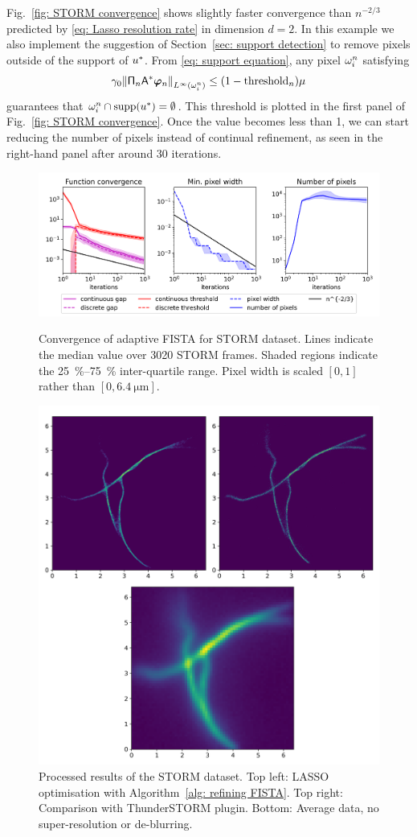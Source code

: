 \documentclass[smallextended]{svjour3}
\newcommand{\norm}[1]{{\left\lVert #1 \right\rVert}}
\newcommand{\op}[1]{\operatorname{#1}}
\newcommand{\1}{\F{1}}
\newcommand*{\var}[1]{%
	\IfEqCase{#1}{%
		{0}{u}%
		{1}{v}%
		{2}{w}%
	}[u#1]%
}
\newcommand*{\vars}[1]{%
	\IfEqCase{#1}{%
		{0}{\alpha}%
		{1}{\beta}%
		{2}{\gamma}%
		{3}{a}%
		{4}{b}%
		{5}{c}%
	}[k#1]%
}
\begin{document}
	Fig.~\ref{fig: STORM convergence} shows slightly faster convergence than $n^{-2/3}$ predicted by \eqref{eq: Lasso resolution rate} in dimension $d=2$. In this example we also implement the suggestion of Section~\ref{sec: support detection} to remove pixels outside of the support of $\var0^*$. From \eqref{eq: support equation}, any pixel $\omega_i^n$ satisfying 
	\begin{equation}
		\vars2_0 \norm{ \tens{\Pi}_n\A^*\vec{\varphi}_n }_{L^\infty(\domain_i^n)} \leq (1-\op{threshold}_n)\mu
	\end{equation}
	guarantees that $\domain_i^n\cap\op{supp}(\var0^*) = \emptyset$. This threshold is plotted in the first panel of Fig.~\ref{fig: STORM convergence}. Once the value becomes less than 1, we can start reducing the number of pixels instead of continual refinement, as seen in the right-hand panel after around 30 iterations.
	
	\begin{figure}\centering
		\includegraphics[width=.82\textwidth]{lasso2_convergence}
		\caption{Convergence of adaptive FISTA for STORM dataset. Lines indicate the median value over 3020 STORM frames. Shaded regions indicate the \SIrange{25}{75}{\percent} inter-quartile range. Pixel width is scaled $[0,1]$ rather than $[0,\SI{6.4}{\micro\meter}]$.}\label{fig: STORM convergence}
		
		\vspace*{\floatsep}
		
		\includegraphics[width=.73\textwidth]{STORM_recon}
		\caption{Processed results of the STORM dataset. Top left: LASSO optimisation with Algorithm~\ref{alg: refining FISTA}. Top right: Comparison with ThunderSTORM plugin. Bottom: Average data, no super-resolution or de-blurring.}\label{fig: STORM results}
	\end{figure}
	
\end{document}
